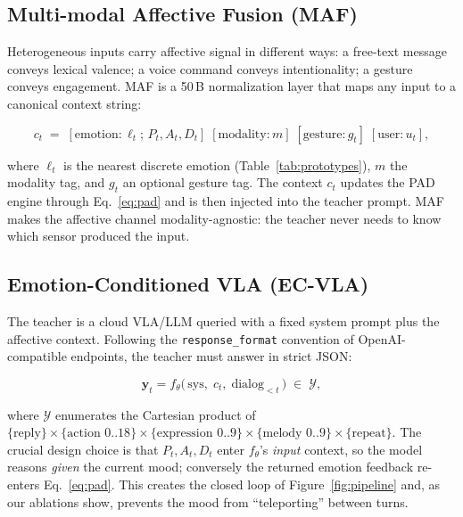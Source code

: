 \documentclass{article}
\theoremstyle{definition}
\begin{document}
\subsection{Multi-modal Affective Fusion (MAF)}

Heterogeneous inputs carry affective signal in different ways: a free-text
message conveys lexical valence; a voice command conveys intentionality; a
gesture conveys engagement. MAF is a 50\,B normalization layer that maps any
input to a canonical context string:

\begin{equation}
c_t \;=\; [\text{emotion:}\, \ell_t;\, P_t, A_t, D_t]
\; [\text{modality:}\, m]\; [\text{gesture:}\, g_t]\; [\text{user:}\, u_t],
\label{eq:context}
\end{equation}

where $\ell_t$ is the nearest discrete emotion (Table~\ref{tab:prototypes}),
$m$ the modality tag, and $g_t$ an optional gesture tag. The context $c_t$
updates the PAD engine through Eq.~\eqref{eq:pad} and is then injected into the
teacher prompt. MAF makes the affective channel modality-agnostic: the teacher
never needs to know which sensor produced the input.

\subsection{Emotion-Conditioned VLA (EC-VLA)}

The teacher is a cloud VLA/LLM queried with a fixed system prompt plus the
affective context. Following the \texttt{response\_format} convention of
OpenAI-compatible endpoints, the teacher must answer in strict JSON:

\begin{equation}
\mathbf{y}_t = f_{\theta}\!\big(\,\text{sys},\; c_t,\;
\text{dialog}_{<t}\,\big) \;\in\;\mathcal{Y},
\label{eq:teacher}
\end{equation}

where $\mathcal{Y}$ enumerates the Cartesian product of
$\{\text{reply}\} \times \{\text{action 0..18}\} \times
\{\text{expression 0..9}\} \times \{\text{melody 0..9}\} \times
\{\text{repeat}\}$. The crucial design choice is that $P_t,A_t,D_t$ enter
$f_\theta$'s \emph{input} context, so the model reasons \emph{given} the current
mood; conversely the returned emotion feedback re-enters Eq.~\eqref{eq:pad}.
This creates the closed loop of Figure~\ref{fig:pipeline} and, as our ablations
show, prevents the mood from ``teleporting'' between turns.
\end{document}
